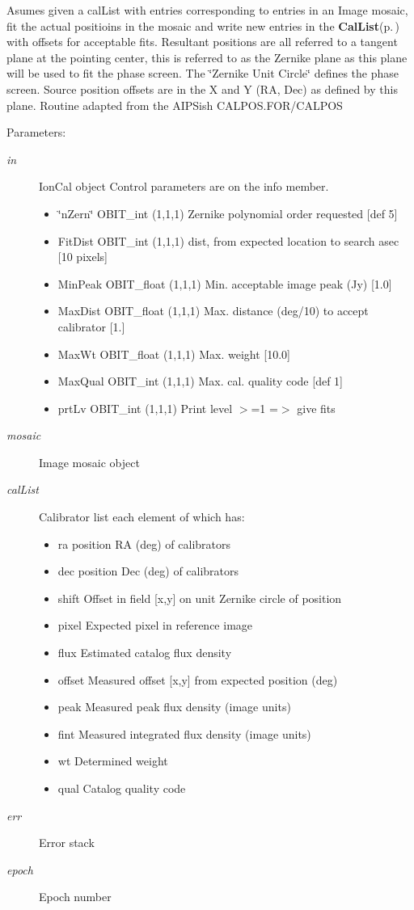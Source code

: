 Asumes given a cal\-List with entries corresponding to entries in an Image mosaic, fit the actual positioins in the mosaic and write new entries in the {\bf Cal\-List}{\rm (p.\,\pageref{structCalList})} with offsets for acceptable fits. Resultant positions are all referred to a tangent plane at the pointing center, this is referred to as the Zernike plane as this plane will be used to fit the phase screen. The \char`\"{}Zernike Unit Circle\char`\"{} defines the phase screen. Source position offsets are in the X and Y (RA, Dec) as defined by this plane. Routine adapted from the AIPSish CALPOS.FOR/CALPOS \begin{Desc}
\item[Parameters:]
\begin{description}
\item[{\em in}]Ion\-Cal object Control parameters are on the info member. \begin{itemize}
\item \char`\"{}n\-Zern\char`\"{} OBIT\_\-int (1,1,1) Zernike polynomial order requested [def 5] \item Fit\-Dist OBIT\_\-int (1,1,1) dist, from expected location to search asec [10 pixels] \item Min\-Peak OBIT\_\-float (1,1,1) Min. acceptable image peak (Jy) [1.0] \item Max\-Dist OBIT\_\-float (1,1,1) Max. distance (deg/10) to accept calibrator [1.] \item Max\-Wt OBIT\_\-float (1,1,1) Max. weight [10.0] \item Max\-Qual OBIT\_\-int (1,1,1) Max. cal. quality code [def 1] \item prt\-Lv OBIT\_\-int (1,1,1) Print level $>$=1 =$>$ give fits \end{itemize}
\item[{\em mosaic}]Image mosaic object \item[{\em cal\-List}]Calibrator list each element of which has: \begin{itemize}
\item ra position RA (deg) of calibrators \item dec position Dec (deg) of calibrators \item shift Offset in field [x,y] on unit Zernike circle of position \item pixel Expected pixel in reference image \item flux Estimated catalog flux density \item offset Measured offset [x,y] from expected position (deg) \item peak Measured peak flux density (image units) \item fint Measured integrated flux density (image units) \item wt Determined weight \item qual Catalog quality code \end{itemize}
\item[{\em err}]Error stack \item[{\em epoch}]Epoch number \end{description}
\end{Desc}
